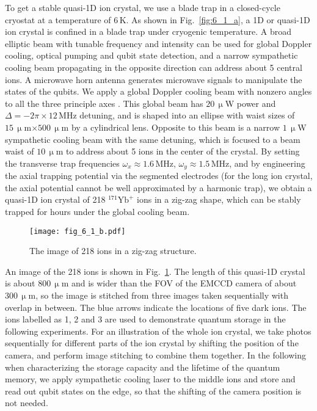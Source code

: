 To get a stable quasi-1D ion crystal, we use a blade trap in a closed-cycle cryostat \cite{pagano2018cryogenic} at a temperature of $6\,$K. As shown in Fig.~\ref{fig:6_1_a}, a 1D or quasi-1D ion crystal is confined in a blade trap under cryogenic temperature. A broad elliptic beam with tunable frequency and intensity can be used for global Doppler cooling, optical pumping and qubit state detection, and a narrow sympathetic cooling beam propagating in the opposite direction can address about 5 central ions. A microwave horn antenna generates microwave signals to manipulate the states of the qubits. We apply a global Doppler cooling beam with nonzero angles to all the three principle axes \cite{RN217, RN106}. This global beam has $20\,\upmu$W power and $\Delta=-2\pi\times 12\,$MHz detuning, and is shaped into an ellipse with waist sizes of $15\,\upmu$m$\times 500\,\upmu$m by a cylindrical lens. Opposite to this beam is a narrow $1\,\upmu$W sympathetic cooling beam with the same detuning, which is focused to a beam waist of $10\,\upmu$m to address about 5 ions in the center of the crystal. By setting the transverse trap frequencies $\omega_x\approx 1.6\,$MHz, $\omega_y\approx 1.5\,$MHz, and by engineering the axial trapping potential via the segmented electrodes (for the long ion crystal, the axial potential cannot be well approximated by a harmonic trap), we obtain a quasi-1D ion crystal of 218 $^{171}\mathrm{Yb}^+$ ions in a zig-zag shape, which can be stably trapped for hours under the global cooling beam.

\begin{figure}
    \centering
    \texttt{[image: fig\_6\_1\_b.pdf]}
    \caption{The image of 218 ions in a zig-zag structure.}
    \label{fig:6_1_b}
\end{figure}

An image of the 218 ions is shown in Fig.~\ref{fig:6_1_b}. The length of this quasi-1D crystal is about $800\,\upmu$m and is wider than the FOV of the EMCCD camera of about $300\,\upmu$m, so the image is stitched from three images taken sequentially with overlap in between. The blue arrows indicate the locations of five dark ions. The ions labelled as 1, 2 and 3 are used to demonstrate quantum storage in the following experiments. For an illustration of the whole ion crystal, we take photos sequentially for different parts of the ion crystal by shifting the position of the camera, and perform image stitching to combine them together. In the following when characterizing the storage capacity and the lifetime of the quantum memory, we apply sympathetic cooling laser to the middle ions \cite{mao2021experimental} and store and read out qubit states on the edge, so that the shifting of the camera position is not needed.



